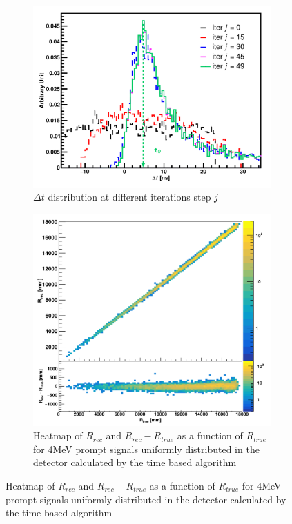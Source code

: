 \begin{figure}
  \begin{subfigure}[t]{0.48\textwidth}
    \centering
    \includegraphics[width=\textwidth]{images/juno/reco/delta_t_peak_distrib.png}
    \caption{$\Delta t$ distribution at different iterations step $j$}
    \label{fig:juno:rec:delta_t_distrib}
  \end{subfigure}
  \hfill
  \begin{subfigure}[t]{0.48\textwidth}
    \centering
    \includegraphics[width=\textwidth]{images/juno/reco/time_based_algorithm.png}
    \caption{Heatmap of $R_{rec}$ and $R_{rec} - R_{true}$ as a function of $R_{true}$ for 4MeV prompt signals uniformly distributed in the detector calculated by the time based algorithm}
    \label{fig:juno:rec:time_based_results}
  \end{subfigure}
\end{figure}

